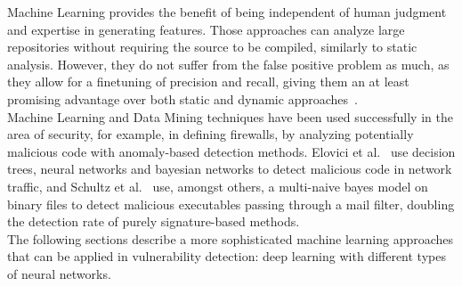 \documentclass[
a4paper,
pagesize,
pdftex,
12pt,
twoside, %
BCOR=5mm, %
ngerman,
fleqn,
final,
]{scrartcl}
\begin{document}
	Machine Learning provides the benefit of being independent of human judgment and expertise in generating features. Those approaches can analyze large repositories without requiring the source to be compiled, similarly to static analysis. However, they do not suffer from the false positive problem as much, as they allow for a finetuning of precision and recall, giving them an at least promising advantage over both static and dynamic approaches~\cite{Russell.2018}. \\
	Machine Learning and Data Mining techniques have been used successfully in the area of security, for example, in defining firewalls, by analyzing potentially malicious code with anomaly-based detection methods. Elovici et al.~\cite{Elovici.2007} use decision trees, neural networks and bayesian networks to detect malicious code in network traffic, and Schultz et al.~\cite{Schultz.2000} use, amongst others, a multi-naive bayes model on binary files to detect malicious executables passing through a mail filter, doubling the detection rate of purely signature-based methods.\\
	The following sections describe a more sophisticated machine learning approaches that can be applied in vulnerability detection: deep learning with different types of neural networks. 
	
\end{document}
